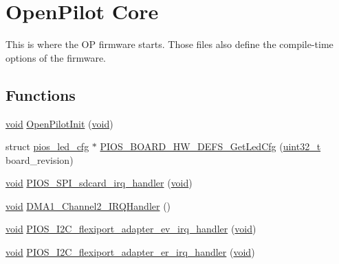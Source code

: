 \hypertarget{group___open_pilot_core}{\section{Open\-Pilot Core}
\label{group___open_pilot_core}
}


This is where the O\-P firmware starts. Those files also define the compile-\/time options of the firmware.  


\subsection*{Functions}
\begin{DoxyCompactItemize}
\item 
\hyperlink{group___n_a_m_e_ga18028b8badbf1ea7e704ccac3c488e82}{void} \hyperlink{group___open_pilot_core_ga4c168099ccb82fb36167e031a5907c57}{Open\-Pilot\-Init} (\hyperlink{group___n_a_m_e_ga18028b8badbf1ea7e704ccac3c488e82}{void})
\item 
struct \hyperlink{structpios__led__cfg}{pios\-\_\-led\-\_\-cfg} $\ast$ \hyperlink{group___open_pilot_core_gafb76ae90816003eabf1d90feff7b1a52}{P\-I\-O\-S\-\_\-\-B\-O\-A\-R\-D\-\_\-\-H\-W\-\_\-\-D\-E\-F\-S\-\_\-\-Get\-Led\-Cfg} (\hyperlink{stdint_8h_a435d1572bf3f880d55459d9805097f62}{uint32\-\_\-t} board\-\_\-revision)
\item 
\hyperlink{group___n_a_m_e_ga18028b8badbf1ea7e704ccac3c488e82}{void} \hyperlink{group___open_pilot_core_ga8cc3bddeeacf6d60783cb8e6b33d6006}{P\-I\-O\-S\-\_\-\-S\-P\-I\-\_\-sdcard\-\_\-irq\-\_\-handler} (\hyperlink{group___n_a_m_e_ga18028b8badbf1ea7e704ccac3c488e82}{void})
\item 
\hyperlink{group___n_a_m_e_ga18028b8badbf1ea7e704ccac3c488e82}{void} \hyperlink{group___open_pilot_core_ga4055152a9bfe1072e00247cc351276ba}{D\-M\-A1\-\_\-\-Channel2\-\_\-\-I\-R\-Q\-Handler} ()
\item 
\hyperlink{group___n_a_m_e_ga18028b8badbf1ea7e704ccac3c488e82}{void} \hyperlink{group___open_pilot_core_ga0b5322143194be1bdf24d9cc88ca275e}{P\-I\-O\-S\-\_\-\-I2\-C\-\_\-flexiport\-\_\-adapter\-\_\-ev\-\_\-irq\-\_\-handler} (\hyperlink{group___n_a_m_e_ga18028b8badbf1ea7e704ccac3c488e82}{void})
\item 
\hyperlink{group___n_a_m_e_ga18028b8badbf1ea7e704ccac3c488e82}{void} \hyperlink{group___open_pilot_core_ga7ae5d4453562364b12d1a9a55c2c9717}{P\-I\-O\-S\-\_\-\-I2\-C\-\_\-flexiport\-\_\-adapter\-\_\-er\-\_\-irq\-\_\-handler} (\hyperlink{group___n_a_m_e_ga18028b8badbf1ea7e704ccac3c488e82}{void})

\end{DoxyCompactItemize}
